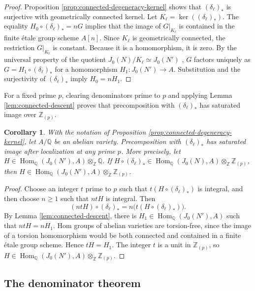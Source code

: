 \documentclass[12pt, letterpaper]{amsart}
\newtheorem{corollary}[theorem]{Corollary}
\theoremstyle{definition}
\theoremstyle{remark}
\newcommand{\Q}{\mathbb Q}
\newcommand{\Z}{\mathbb Z}
\newcommand{\Hom}{\operatorname{Hom}}
\numberwithin{equation}{section}
\begin{document}
\begin{proof}
Proposition \ref{prop:connected-degeneracy-kernel} shows that
\((\delta_\ell)_*\) is surjective with geometrically connected kernel.
Let \(K_\ell=\ker((\delta_\ell)_*)\). The equality
\(H_0\circ(\delta_\ell)_*=nG\) implies that the image of \(G|_{K_\ell}\) is
contained in the finite \'etale group scheme \(A[n]\). Since \(K_\ell\) is
geometrically connected,
the restriction \(G|_{K_\ell}\) is constant. Because it is a homomorphism,
it is zero.
By the universal property of the quotient
\(J_0(N)/K_\ell\simeq J_0(N')\)
\cite{Poonen}, \(G\) factors uniquely as
\(G=H_1\circ(\delta_\ell)_*\) for a homomorphism \(H_1:J_0(N')\to A\). Substitution and
the surjectivity of \((\delta_\ell)_*\) imply \(H_0=nH_1\).
\end{proof}

For a fixed prime \(p\), clearing denominators prime to \(p\) and
applying Lemma \ref{lem:connected-descent} proves that precomposition with
\((\delta_\ell)_*\) has saturated image over \(\Z_{(p)}\).

\begin{corollary}\label{cor:connected-local}
With the notation of Proposition \ref{prop:connected-degeneracy-kernel}, let
\(A/\Q\) be an abelian variety. Precomposition with \((\delta_\ell)_*\) has
saturated image after localization at any prime \(p\). More precisely, let
\(H\in\Hom_\Q(J_0(N'),A)\otimes_\Z\Q\). If
\(H\circ(\delta_\ell)_*\in
\Hom_\Q(J_0(N),A)\otimes_\Z\Z_{(p)}\),
then \(H\in\Hom_\Q(J_0(N'),A)\otimes_\Z\Z_{(p)}\).
\end{corollary}

\begin{proof}
Choose an integer \(t\) prime to \(p\) such that
\(t(H\circ(\delta_\ell)_*)\) is integral, and then choose \(n\geq1\) such that
\(ntH\) is integral. Then
\[
        (ntH)\circ(\delta_\ell)_*
        =n\bigl(t(H\circ(\delta_\ell)_*)\bigr).
\]
By Lemma \ref{lem:connected-descent}, there is
\(H_1\in\Hom_\Q(J_0(N'),A)\) such that \(ntH=nH_1\). Hom groups of abelian
varieties are torsion-free, since the image of a torsion homomorphism would be
both connected and contained in a finite \'etale group scheme. Hence
\(tH=H_1\). The integer \(t\) is a unit in \(\Z_{(p)}\), so
\(H\in\Hom_\Q(J_0(N'),A)\otimes_\Z\Z_{(p)}\).
\end{proof}

\subsection{The denominator theorem}
\end{document}
